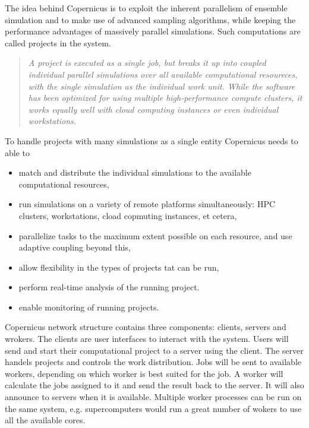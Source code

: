 The idea behind Copernicus is to exploit the inherent parallelism of
ensemble simulation and to make use of advanced sampling algorithms,
while keeping the performance advantages of massively parallel
simulations. Such computations are called projects in the system.

\begin{quote} \slshape
  A project is executed as a single job, but breaks it up into coupled
  individual parallel simulations over all available computational
  resoureces, with the single simulation as the individual work
  unit. While the software has been optimized for using multiple
  high-performance compute clusters, it works equally well with cloud
  computing instances or even individual
  workstations.\citep{pronk:2011}
\end{quote}

To handle projects with many simulations as a single entity Copernicus
needs to able to
\renewcommand{\labelitemi}{-}
\begin{itemize} \slshape
\item match and distribute the individual simulations to the available
  computational resources,
\item run simulations on a variety of remote platforms simultaneously:
  HPC clusters, workstations, cload copmuting instances, et cetera,
\item parallelize tasks to the maximum extent possible on each
  resource, and use adaptive coupling beyond this,
\item allow flexibility in the types of projects tat can be run,
\item perform real-time analysis of the running project.
\item enable monitoring of running projects.\citep{pronk:2011}
\end{itemize}

Copernicus network structure contains three components: clients,
servers and wrokers. The clients are user interfaces to interact with
the system. Users will send and start their computational project to a
server using the client. The server handels projects and controls the
work distribution. Jobs will be sent to available workers, depending
on which worker is best suited for the job. A worker will calculate
the jobs assigned to it and send the result back to the server. It
will also announce to servers when it is available. Multiple worker
processes can be run on the same system, e.g. supercomputers would run
a great number of wokers to use all the available cores.

